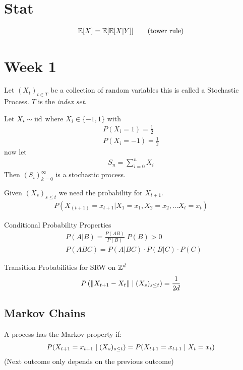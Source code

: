 \documentclass[12pt,a4paper]{article}
\begin{document}
\section*{Stat}
\begin{align*}
\mathbb{E}[X] = \mathbb{E}[\mathbb{E}[X|Y]] \tag{tower rule}
\end{align*}
\newpage
\section{Week 1}
\begin{defn}
Let $(X_t)_{t\in T}$ be a collection of random variables this is called a Stochastic Process. $T$ is the \textit{index set}. 
\end{defn}
\begin{example}
Let $X_i\thicksim \mathrm{iid}$ where $X_i \in \{-1,1\}$ with 
\begin{align*}
P(X_i = 1) = \frac{1}{2}\\
P(X_i = -1) = \frac{1}{2}
\end{align*}
now let 
\begin{align*}
S_n = \sum_{i=0}^n X_i
\end{align*}
Then $(S_i)_{k=0}^\infty$ is a stochastic process.  
\end{example}

\begin{defn}
Given $(X_s)_{s \leq t}$ we need the probability for $X_{t+1}$.
\begin{align*}
P(X_{(t+1)} = x_{t+1} \vert X_1 = x_1 , X_2 = x_2, \ldots X_t = x_t)
\end{align*}
\end{defn}


\begin{note}{Conditional Probability Properties}
\begin{align*}
&P(A | B) = \frac{P(AB)}{P(B)} \; P(B) > 0\\
&P(ABC) = P(A|BC) \cdot P(B|C) \cdot P(C)
\end{align*}
\end{note}

\begin{example}{Transition Probabilities for SRW on $\mathbb{Z}^d$}
\begin{align*}
P\left(\norm{X_{t+1} - X_{t}} \;\vert\; (X_{s})_{s \leq t} \right) = \frac{1}{2d} 
\end{align*}
\end{example}
\newpage
\subsection{Markov Chains}
\begin{defn}
\label{markovprop}
A process has the Markov property if:
\begin{align*}
P(X_{t+1}= x_{t+1} \;\vert\; (X_{s})_{s\leq t}) = P(X_{t+1} = x_{t+1} \;\vert\; X_{t} = x_t)
\end{align*}
(Next outcome only depends on the previous outcome)
\end{defn}
\end{document}
